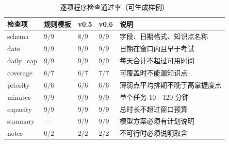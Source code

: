 \documentclass[UTF8,12pt,a4paper]{ctexart}
\begin{document}
\begin{table}[H]
\centering
\caption{逐项程序检查通过率（可生成样例）}
\label{tab:checkrates}
\small
\begin{tabularx}{\textwidth}{L{3.2cm}L{2.4cm}L{2.4cm}L{2.4cm}X}
\toprule
检查项 & 规则模板 & v0.5 & v0.6 & 说明 \\
\midrule
schema & 9/9 & 8/9 & 9/9 & 字段、日期格式、知识点名称 \\
date & 9/9 & 9/9 & 9/9 & 日期在窗口内且早于考试 \\
daily\_cap & 9/9 & 9/9 & 9/9 & 每天合计不超过可用时间 \\
coverage & 6/7 & 6/7 & 7/7 & 可覆盖时不能漏知识点 \\
priority & 6/6 & 6/6 & 6/6 & 薄弱点平均排期不晚于高掌握度点 \\
minutes & 9/9 & 9/9 & 9/9 & 单个任务 10—120 分钟 \\
capacity & 9/9 & 9/9 & 9/9 & 总时长不超过窗口预算 \\
summary & — & 9/9 & 9/9 & 模型方案必须有计划说明 \\
notes & 0/2 & 2/2 & 2/2 & 不可行时必须说明取舍 \\
\bottomrule
\end{tabularx}
\end{table}
\end{document}

